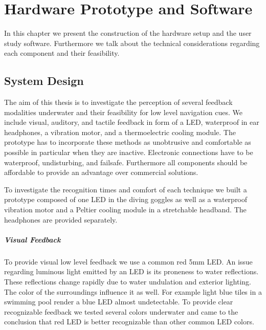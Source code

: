 %

\chapter{Hardware Prototype and Software }
\label{ownwork} 


In this chapter we present the construction of the hardware setup and the user study software. 
Furthermore we talk about the technical considerations regarding each component and their feasibility.


\section{System Design}
The aim of this thesis is to investigate the perception of several feedback modalities underwater and their feasibility for low level navigation cues.
We include visual, auditory, and tactile feedback in form of a LED, waterproof in ear headphones,  a vibration motor, and a thermoelectric cooling module.
The prototype has to incorporate these methods as unobtrusive and comfortable as possible in particular when they are  inactive. 
Electronic connections have to be waterproof, undisturbing, and failsafe.
Furthermore all components should be affordable to provide an advantage over commercial solutions.

To investigate the recognition times and comfort of each technique we built a prototype composed of one LED in the diving goggles as well as a waterproof vibration motor and a Peltier cooling module in a stretchable headband.
The headphones are provided separately.

\paragraph{Visual Feedback}

To provide visual low level feedback we use a common red 5mm LED.
An issue regarding luminous light emitted by an LED is its proneness to water reflections.
These reflections change rapidly due to water undulation and exterior lighting.
The color of the surroundings influence it as well.
For example light blue tiles in a swimming pool render a blue LED almost undetectable.
To provide clear recognizable feedback we tested several colors underwater and came to the conclusion that red LED is better recognizable than other common LED colors.

